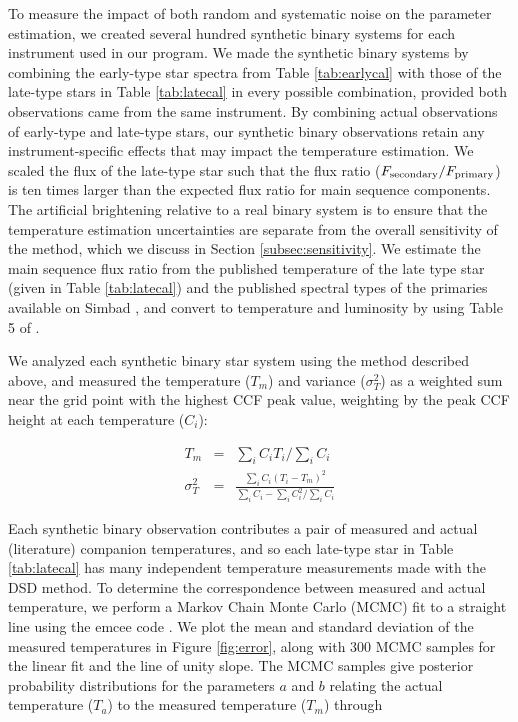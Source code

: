 \documentclass{emulateapj}
\begin{document}
To measure the impact of both random and systematic noise on the parameter estimation, we created several hundred synthetic binary systems for each instrument used in our program. We made the synthetic binary systems by combining the early-type star spectra from Table \ref{tab:earlycal} with those of the late-type stars in Table \ref{tab:latecal} in every possible combination, provided both observations came from the same instrument. By combining actual observations of early-type and late-type stars, our synthetic binary observations retain any instrument-specific effects that may impact the temperature estimation. We scaled the flux of the late-type star such that the flux ratio ($F_{\rm secondary}/F_{\rm primary}$) is ten times larger than the expected flux ratio for main sequence components. The artificial brightening relative to a real binary system is to ensure that the temperature estimation uncertainties are separate from the overall sensitivity of the method, which we discuss in Section \ref{subsec:sensitivity}. We estimate the main sequence flux ratio from the published temperature of the late type star (given in Table \ref{tab:latecal}) and the published spectral types of the primaries available on Simbad \citep{Simbad}, and convert to temperature and luminosity by using Table 5 of \citet{Pecaut2013}.


We analyzed each synthetic binary star system using the method described above, and measured the temperature ($T_m$) and variance ($\sigma_T^2$) as a weighted sum near the grid point with the highest CCF peak value, weighting by the peak CCF height at each temperature ($C_i$):

\begin{eqnarray}
\label{eqn:tmeas} 
T_m &=& \sum_i C_i T_i / \sum_i C_i \\
\sigma_T^2 &=& \frac{\sum_i C_i (T_i - T_m)^2}{ \sum_i C_i - \sum_i C_i^2 / \sum_i C_i}
\end{eqnarray}

Each synthetic binary observation contributes a pair of measured and actual (literature) companion temperatures, and so each late-type star in Table \ref{tab:latecal} has many independent temperature measurements made with the DSD method. To determine the correspondence between measured and actual temperature, we perform a Markov Chain Monte Carlo (MCMC) fit to a straight line using the emcee code \citep{emcee}. We plot the mean and standard deviation of the measured temperatures in Figure \ref{fig:error}, along with 300 MCMC samples for the linear fit and the line of unity slope. The MCMC samples give posterior probability distributions for the parameters $a$ and $b$ relating the actual temperature ($T_a$) to the measured temperature ($T_m$) through
\end{document}
